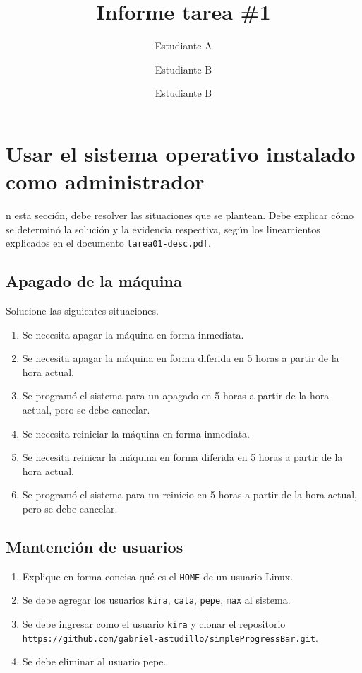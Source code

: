 \documentclass[10pt,letterpaper,twoside,onecolumn]{rho-class/rho}
\title{Informe tarea \#1}
\author[1]{Estudiante A}
\author[2]{Estudiante B}
\author[3]{Estudiante B}
\affil[1]{Afiliación autor A}
\affil[2]{Afiliación autor B}
\affil[3]{Afiliación autor C}
\begin{document}
	
    \maketitle
    \thispagestyle{firststyle}


\section{Usar el sistema operativo instalado como administrador}
     n esta sección, debe resolver las situaciones que se plantean. Debe explicar cómo se determinó la solución y la evidencia respectiva, según los lineamientos explicados en el documento \texttt{tarea01-desc.pdf}.
   

    \subsection{Apagado de la máquina}
    Solucione las siguientes situaciones.
    \begin{enumerate}
        \item Se necesita apagar la máquina en forma inmediata.
        \item Se necesita apagar la máquina en forma diferida en 5 horas a partir de la hora actual.
        \item Se programó el sistema para un apagado en 5 horas a partir de la hora actual, pero se debe cancelar.
        \item Se necesita reiniciar la máquina en forma inmediata.
        \item Se necesita reinicar la máquina en forma diferida en 5 horas a partir de la hora actual.
        \item Se programó el sistema para un reinicio en 5 horas a partir de la hora actual, pero se debe cancelar.
    \end{enumerate}

    \subsection{Mantención de usuarios}
    \begin{enumerate}
        \item Explique en forma concisa qué es el \texttt{HOME} de un usuario Linux.
        \item Se debe agregar los usuarios  \texttt{kira},  \texttt{cala},  \texttt{pepe},  \texttt{max} al sistema.
        \item Se debe ingresar como el usuario  \texttt{kira} y clonar el repositorio \texttt{https://github.com/gabriel-astudillo/simpleProgressBar.git}.
        \item Se debe eliminar al usuario pepe.
    \end{enumerate}
\end{document}
